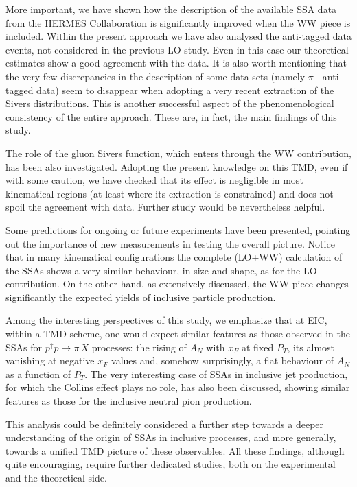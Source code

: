 \documentclass[nofootinbib,superscriptaddress,aps]{revtex4}
\begin{document}
More important, we have shown how the description of the available SSA data from the HERMES Collaboration is significantly improved when the WW piece is included. Within the present approach we have also analysed the anti-tagged data events, not considered in the previous LO study. Even in this case our theoretical estimates show a good agreement with the data. It is also worth mentioning that the very few discrepancies in the description of some data sets (namely $\pi^+$ anti-tagged data) seem to disappear when adopting a very recent extraction of the Sivers distributions. This is another successful aspect of the phenomenological consistency of the entire approach. These are, in fact, the main findings of this study.

The role of the gluon Sivers function, which enters through the WW contribution, has been also investigated. Adopting the present knowledge on this TMD, even if with some caution, we have checked that its effect is negligible in most kinematical regions (at least where its extraction is constrained) and does not spoil the agreement with data. Further study would be nevertheless helpful.

Some predictions for ongoing or future experiments have been presented, pointing out the importance of new measurements in testing the overall picture. Notice that in many kinematical configurations the complete (LO+WW) calculation of the SSAs shows a very similar behaviour, in size and shape, as for the LO contribution. On the other hand, as extensively discussed, the WW piece changes significantly the expected yields of inclusive particle production.

Among the interesting perspectives of this study, we emphasize that at EIC, within a TMD scheme, one would expect similar features as those observed in the SSAs for $p^\uparrow p\to \pi\, X$ processes: the rising of $A_N$ with $x_F$ at fixed $P_T$, its almost vanishing at negative $x_F$ values and, somehow surprisingly, a flat behaviour of $A_N$ as a function of $P_T$. The very interesting case of SSAs in inclusive jet production, for which the Collins effect plays no role, has also been discussed, showing similar features as those for the inclusive neutral pion production.

This analysis could be definitely considered a further step towards a deeper understanding of the origin of SSAs in inclusive processes, and more generally, towards a unified TMD picture of these observables. All these findings, although quite encouraging, require further dedicated studies, both on the experimental and the theoretical side.
\end{document}

